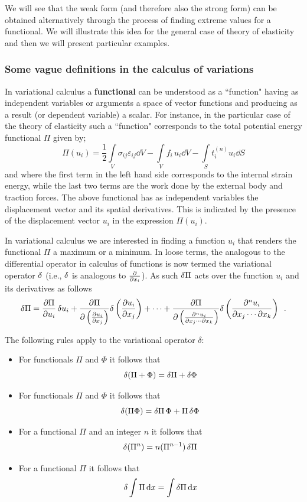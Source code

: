 We will see that the weak form (and therefore also the strong form) can be obtained alternatively through the process of finding extreme values for a functional. We will illustrate this idea for the general case of theory of elasticity and then we will present particular examples.

\subsubsection*{Some vague definitions in the calculus of variations}
In variational calculus a {\bf functional} can be understood as a ``function" having as independent variables or arguments a space of vector functions and producing as a result (or dependent variable) a scalar. For instance, in the particular case of the theory of elasticity such a ``function" corresponds to the total potential energy functional $\Pi$ given by;
\begin{equation}\label{eq:Potential}
    \Pi(u_i) = \frac{1}{2}\int\limits_V \sigma_{ij}\varepsilon_{ij}\dd{V}  - \int\limits_V f_i\, u_i\dd{V}  - \int\limits_S t_i^{(n)} u_i\dd{S}
\end{equation}
and where the first term in the left hand side corresponds to the internal strain energy, while the last two terms are the work done by the external body and traction forces. The above functional has as independent variables the displacement vector and its spatial derivatives. This is indicated by the presence of the displacement vector $u_i$ in the expression $\Pi(u_i)$.

In variational calculus we are interested in finding a function $u_i$ that renders the functional $\Pi$ a maximum or a minimum. In loose terms, the analogous to the differential operator in calculus of functions is now termed the variational operator $\var$ (i.e., $\var$ is analogous to $\pdv{x_i}$). As such $\var{\Pi}$ acts over the function $u_i$ and its derivatives as follows
\[\var{\Pi}  = \pdv{\Pi}{u_i}\var{u_i} + \pdv{\Pi}{\left( \pdv{u_i}{x_j}\right)} \delta\left(\pdv{u_i}{x_j}\right) + \cdots + \pdv{\Pi}{\left( \pdv{^{n}u_i}{x_j \cdots \partial x_k}\right)} \delta\left( \pdv{^{n}u_i}{x_j \cdots \partial x_k}\right) \enspace .\]

The following rules apply to the variational operator $\delta$:
\begin{itemize}
\item For functionals $\Pi$ and $\Phi$ it follows that \[\var(\Pi  + \Phi) = \var{\Pi}  + \var{\Phi}\]
\item For functionals $\Pi$ and $\Phi$ it follows that \[\var(\Pi \Phi ) = \var{\Pi} \Phi  + \Pi \var{\Phi}\]
\item For a functional $\Pi$ and an integer $n$ it follows that \[\var(\Pi^n) = n(\Pi^{n - 1})\var{\Pi}\]
\item For a functional $\Pi$ it follows that \[\var{\int \Pi \dd{x}}  = \int \var{\Pi} \dd{x} \]
\end{itemize}

